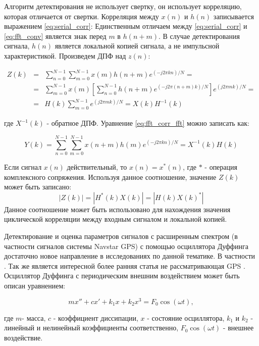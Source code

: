 Алгоритм детектирования не использует свертку, он использует корреляцию, которая отличается от свертки. Корреляция
между $x(n)$ и $h(n)$ записывается выражением \ref{eq:serial_corr}:
Единственным отличаем между \ref{eq:serial_corr} и \ref{eq:fft_conv} является знак перед $m$ в ${h(n+m)}$.
В случае детектирования сигнала, $h(n)$ является локальной копией сигнала, а не импульсной характеристикой.
Произведем ДПФ над $z(n)$:
\begin{center}
\begin{eqnarray}
	\label{eq:fft_corr_fft}
	Z(k) & = & \sum\limits_{n=0}^{N-1}\sum\limits_{m=0}^{N-1}{x(m)h(n+m)e^{(-j2\pi{kn})/N}}=\nonumber \\
	& = & \sum\limits_{m=0}^{N-1}{x(m)}[\sum\limits_{n=0}^{N-1}h(n+m)e^{(-j2\pi{(n+m)}k)/N}]e^{(j2\pi{m}k)/N}=\\
	& = & H(k)\sum\limits_{m=0}^{N-1}e^{(j2\pi{m}k)/N} = X(k)H^{-1}(k)\nonumber 
\end{eqnarray}
\end{center}
где ${X^{-1}(k)}$ - обратное ДПФ. Уравнение \ref{eq:fft_corr_fft} можно записать как:

\begin{equation}
	\label{eq:fft_corr_fft_rev}
	Y(k) = \sum\limits_{n=0}^{N-1}\sum\limits_{m=0}^{N-1}{x(n+m)h(m)e^{(-j2\pi{kn})/N}}=X^{-1}(k)H(k)
\end{equation}

Если сигнал $x(n)$ действительный, то $x(n) = x^*(n)$, где ${*}$ - операция комплексного сопряжения. Используя данное соотношение,
значение $Z(k)$ может быть записано:
\begin{equation}
	\label{eq:fft_magnitude}
	|Z(k)|=|H^*(k)X(k)|=|H(k)X(k)^*|
\end{equation}
Данное соотношение может быть использовано для нахождения значения циклической корреляции между входным сигналом и 
локальной копией.

Детектирование и оценка параметров сигналов с расширенным спектром (в частности сигналов системы Navstar GPS) с помощью осциллятора Дуффинга
достаточно новое направление в исследованиях по данной тематике. В частности \cite{chaos_chen, chaos_cambridge, chaos_huang, chaos_song}.
Так же является интересной более ранняя статья не рассматривающая GPS \cite{chaos_wang}.
Осциллятор Дуффинга с периодическим внешним воздействием может быть описан уравнением:
\begin{center}
\begin{equation}
	\label{eq:duffing}
	mx'' + cx' + k_{1}x + k_{2}x^3 = F_{0}\cos(\omega{t}),
\end{equation}
\end{center}
где $m$- масса, $c$ - коэффициент диссипации, $x$ - состояние осциллятора, $k_1$ и $k_2$ - линейный и нелинейный коэффициенты соответственно,
$F_{0}\cos(\omega{t})$ - внешнее воздействие.

